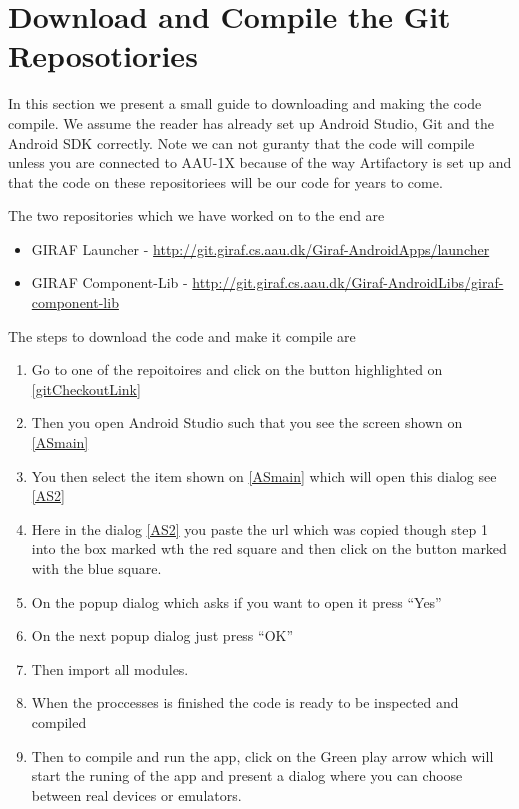 \section{Download and Compile the Git Reposotiories}
In this section we present a small guide to downloading and making the code
compile. We assume the reader has already set up Android Studio, Git and the
Android SDK correctly. Note we can not guranty that the code will compile unless you are
connected to AAU-1X because of the way Artifactory is set up and that the
code on these repositoriees will be our code for years to come.\nl

The two repositories which we have worked on to the end are

\begin{itemize}
  \item GIRAF Launcher -
  \url{http://git.giraf.cs.aau.dk/Giraf-AndroidApps/launcher}
  \item GIRAF Component-Lib -
  \url{http://git.giraf.cs.aau.dk/Giraf-AndroidLibs/giraf-component-lib}
\end{itemize}

The steps to download the code and make it compile are
\begin{enumerate}
  \item Go to one of the repoitoires and click on the button highlighted on
  \autoref{gitCheckoutLink}
  \item Then you open Android Studio such that you see the screen shown on
  \autoref{ASmain}
  \item You then select the item shown on \autoref{ASmain} which will open this
  dialog see \autoref{AS2}
  \item Here in the dialog \autoref{AS2} you paste the url which was copied
  though step 1 into the box marked wth the red square and then click on the button
  marked with the blue square. 
  \item On the popup dialog which asks if you want to open it press ``Yes''
  \item On the next popup dialog just press ``OK''
  \item Then import all modules.
  \item When the proccesses is finished the code is ready to be inspected
  and compiled
  \item Then to compile and run the app, click on the Green play arrow which
  will start the runing of the app and present a dialog where you can choose
  between real devices or emulators.
\end{enumerate}





